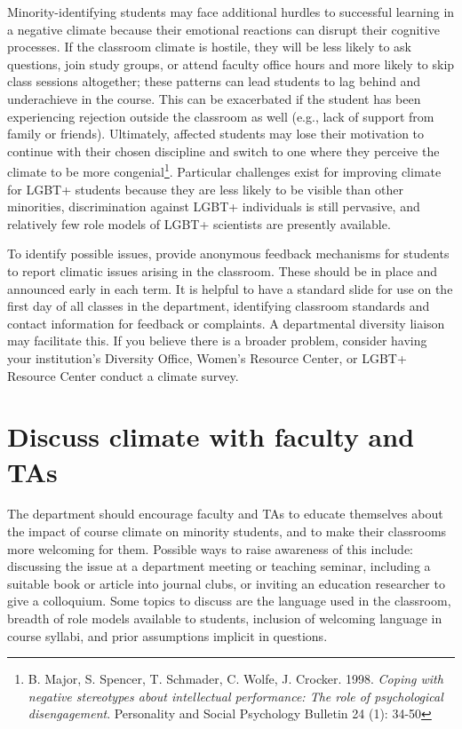 Minority-identifying students may face additional hurdles to successful learning in a negative climate because their emotional reactions can disrupt their cognitive processes. If the classroom climate is hostile, they will be less likely to ask questions, join study groups, or attend faculty office hours and more likely to skip class sessions altogether; these patterns can lead students to lag behind and underachieve in the course. This can be exacerbated if the student has been experiencing rejection outside the classroom as well (e.g., lack of support from family or friends). Ultimately, affected students may lose their motivation to continue with their chosen discipline and switch to one where they perceive the climate to be more congenial\footnote{B. Major, S. Spencer, T. Schmader, C. Wolfe, J. Crocker. 1998. \emph{Coping with negative stereotypes about intellectual performance: The role of psychological disengagement}. Personality and Social Psychology Bulletin 24 (1): 34-50}. Particular challenges exist for improving climate for LGBT+ students because they are less likely to be visible than other minorities, discrimination against LGBT+ individuals is still pervasive, and relatively few role models of LGBT+ scientists are presently available.

To identify possible issues, provide anonymous feedback mechanisms for students to report climatic issues arising in the classroom. These should be in place and announced early in each term. It is helpful to have a standard slide for use on the first day of all classes in the department, identifying classroom standards and contact information for feedback or complaints. A departmental diversity liaison may facilitate this. If you believe there is a broader problem, consider having your institution's Diversity Office, Women's Resource Center, or LGBT+ Resource Center conduct a climate survey.

\section {Discuss climate with faculty and TAs}
\label{train-faculty}
The department should encourage faculty and TAs to educate themselves about the impact of course climate on minority students, and to make their classrooms more welcoming for them. Possible ways to raise awareness of this include: discussing the issue at a department meeting or teaching seminar, including a suitable book or article into journal clubs, or inviting an education researcher to give a colloquium. Some topics to discuss are the language used in the classroom, breadth of role models available to students, inclusion of welcoming language in course syllabi, and prior assumptions implicit in questions.

